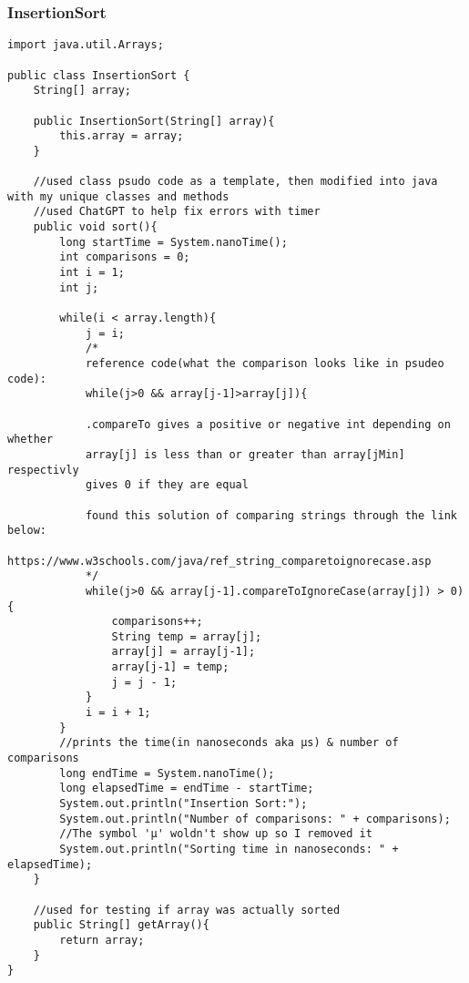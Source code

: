 \documentclass[10pt]{article}
\begin{document}
\subsubsection{InsertionSort}
\lstset{numbers=left, numberstyle=\tiny, stepnumber=1, numbersep=5pt, basicstyle=\footnotesize\ttfamily}
\begin{lstlisting}[frame=single, ]  
import java.util.Arrays;

public class InsertionSort {
    String[] array;
    
    public InsertionSort(String[] array){
        this.array = array;
    }

    //used class psudo code as a template, then modified into java with my unique classes and methods
    //used ChatGPT to help fix errors with timer
    public void sort(){
        long startTime = System.nanoTime();
        int comparisons = 0;
        int i = 1;
        int j;

        while(i < array.length){
            j = i;
            /*
            reference code(what the comparison looks like in psudeo code):
            while(j>0 && array[j-1]>array[j]){

            .compareTo gives a positive or negative int depending on whether
            array[j] is less than or greater than array[jMin] respectivly
            gives 0 if they are equal

            found this solution of comparing strings through the link below:
            https://www.w3schools.com/java/ref_string_comparetoignorecase.asp
            */
            while(j>0 && array[j-1].compareToIgnoreCase(array[j]) > 0){
                comparisons++;
                String temp = array[j];
                array[j] = array[j-1];
                array[j-1] = temp;
                j = j - 1;
            }
            i = i + 1;
        }
        //prints the time(in nanoseconds aka μs) & number of comparisons
        long endTime = System.nanoTime();
        long elapsedTime = endTime - startTime;
        System.out.println("Insertion Sort:");
        System.out.println("Number of comparisons: " + comparisons);
        //The symbol 'μ' woldn't show up so I removed it
        System.out.println("Sorting time in nanoseconds: " + elapsedTime);
    }

    //used for testing if array was actually sorted
    public String[] getArray(){
        return array;
    }
}
\end{lstlisting}
\end{document}
